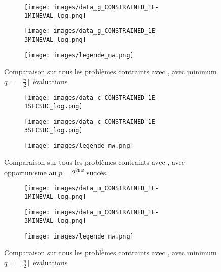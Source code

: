 \begin{figure}[!htb]
	\centering
	\begin{subfigure}{0.43\textwidth}
		\texttt{[image: images/data\_g\_CONSTRAINED\_1E-1MINEVAL\_log.png]}
	\end{subfigure}%
	\begin{subfigure}{0.43\textwidth}
		\texttt{[image: images/data\_g\_CONSTRAINED\_1E-3MINEVAL\_log.png]}
	\end{subfigure}
	\smallskip
	\begin{subfigure}{0.95\textwidth}
		\texttt{[image: images/legende\_mw.png]}
	\end{subfigure}
	\caption{Comparaison sur tous les problèmes contraints avec \GPS, avec minimum $q~=~\lceil\frac{n}{2}\rceil$ évaluations}
	\label{fig:gps_const_mineval}
\end{figure}
\begin{figure}[!htb]
	\centering
	\begin{subfigure}{0.43\textwidth}
		\texttt{[image: images/data\_c\_CONSTRAINED\_1E-1SECSUC\_log.png]}
	\end{subfigure}%
	\begin{subfigure}{0.43\textwidth}
		\texttt{[image: images/data\_c\_CONSTRAINED\_1E-3SECSUC\_log.png]}
	\end{subfigure}
	\smallskip
	\begin{subfigure}{0.95\textwidth}
		\texttt{[image: images/legende\_mw.png]}
	\end{subfigure}
	\caption{Comparaison sur tous les problèmes contraints avec \MADS, avec opportunisme au $p=2^{\text{ème}}$ succès.}
	\label{fig:mads_const_secsuc}
\end{figure}
\begin{figure}[!htb]
	\centering
	\begin{subfigure}{0.43\textwidth}
		\texttt{[image: images/data\_m\_CONSTRAINED\_1E-1MINEVAL\_log.png]}
	\end{subfigure}%
	\begin{subfigure}{0.43\textwidth}
		\texttt{[image: images/data\_m\_CONSTRAINED\_1E-3MINEVAL\_log.png]}
	\end{subfigure}
	\smallskip
	\begin{subfigure}{0.95\textwidth}
		\texttt{[image: images/legende\_mw.png]}
	\end{subfigure}
	\caption{Comparaison sur tous les problèmes contraints avec \MADS, avec minimum $q~=~\lceil\frac{n}{2}\rceil$ évaluations}
	\label{fig:mads_const_mineval}
\end{figure}
